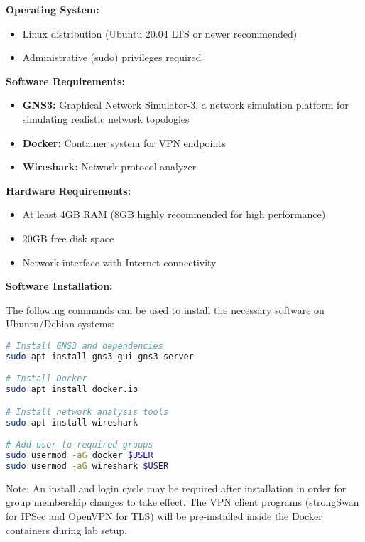 \begin{tcolorbox}[colback=blue!5!white,colframe=blue!75!black,title=System Requirements]
\textbf{Operating System:}
\begin{itemize}
    \item Linux distribution (Ubuntu 20.04 LTS or newer recommended)
    \item Administrative (sudo) privileges required
\end{itemize}

\textbf{Software Requirements:}
\begin{itemize}
    \item \textbf{GNS3:} Graphical Network Simulator-3, a network simulation platform for simulating realistic network topologies
    \item \textbf{Docker:} Container system for VPN endpoints
    \item \textbf{Wireshark:} Network protocol analyzer
\end{itemize}

\textbf{Hardware Requirements:}
\begin{itemize}
    \item At least 4GB RAM (8GB highly recommended for high performance)
    \item 20GB free disk space
    \item Network interface with Internet connectivity
\end{itemize}
\end{tcolorbox}

\noindent
\textbf{Software Installation:}

\noindent
The following commands can be used to install the necessary software on Ubuntu/Debian systems:

\begin{lstlisting}[language=bash]
# Install GNS3 and dependencies
sudo apt install gns3-gui gns3-server

# Install Docker
sudo apt install docker.io

# Install network analysis tools
sudo apt install wireshark

# Add user to required groups
sudo usermod -aG docker $USER
sudo usermod -aG wireshark $USER
\end{lstlisting}

Note: An install and login cycle may be required after installation in order for group membership changes to take effect. The VPN client programs (strongSwan for IPSec and OpenVPN for TLS) will be pre-installed inside the Docker containers during lab setup.

